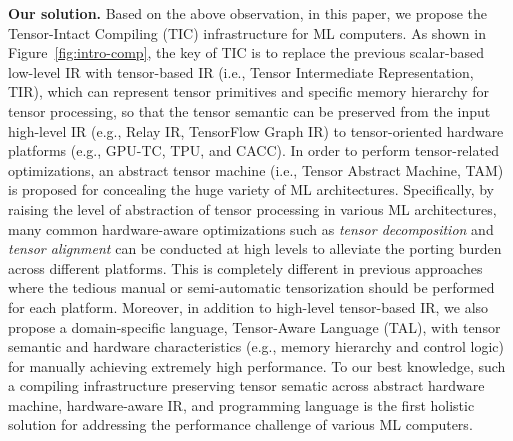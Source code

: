 \textbf{Our solution.} Based on the above observation, in this paper, we propose the Tensor-Intact Compiling (TIC) infrastructure for ML computers. As shown in Figure~\ref{fig:intro-comp}, the key of TIC is to replace the previous scalar-based low-level IR with tensor-based IR (i.e., Tensor Intermediate Representation, TIR), which can represent tensor primitives and specific memory hierarchy for tensor processing, so that the tensor semantic can be preserved from the input high-level IR (e.g., Relay IR, TensorFlow Graph IR) to tensor-oriented hardware platforms (e.g., GPU-TC, TPU, and CACC). In order to perform tensor-related optimizations, an abstract tensor machine (i.e., Tensor Abstract Machine, TAM) is proposed for concealing the huge variety of ML architectures. Specifically, by raising the level of abstraction of tensor processing in various ML architectures, many common hardware-aware optimizations such as \emph{tensor decomposition} and \emph{tensor alignment} can be conducted at high levels to alleviate the porting burden across different platforms. This is completely different in previous approaches where the tedious manual or semi-automatic tensorization should be performed for each platform. Moreover, in addition to high-level tensor-based IR, we also propose a domain-specific language, Tensor-Aware Language (TAL), with tensor semantic and hardware characteristics (e.g., memory hierarchy and control logic) for manually achieving extremely high performance. To our best knowledge, such a compiling infrastructure preserving tensor sematic across abstract hardware machine, hardware-aware IR, and programming language is the first holistic solution for addressing the performance challenge of various ML computers.


